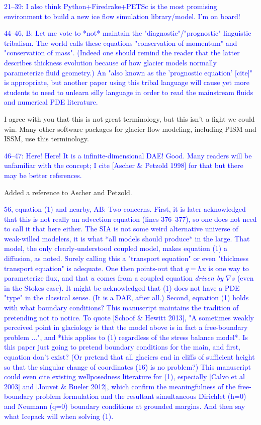 \documentclass{article}
\theoremstyle{definition}
\theoremstyle{plain}
\begin{document}
\textcolor{blue}{21--39:  I also think Python+Firedrake+PETSc is the most promising environment to build a new ice flow simulation library/model.  I'm on board!}

\textcolor{blue}{44--46, B:  Let me vote to *not* maintain the "diagnostic"/"prognostic" linguistic tribalism.  The world calls these equations "conservation of momentum" and "conservation of mass".  (Indeed one should remind the reader that the latter describes thickness evolution because of how glacier models normally parameterize fluid geometry.)  An "also known as the 'prognostic equation' [cite]" is appropriate, but another paper using this tribal language will cause yet more students to need to unlearn silly language in order to read the mainstream fluids and numerical PDE literature.}

I agree with you that this is not great terminology, but this isn't a fight we could win.
Many other software packages for glacier flow modeling, including PISM and ISSM, use this terminology.

\textcolor{blue}{46--47:  Here!  Here!  It is a infinite-dimensional DAE!  Good.  Many readers will be unfamiliar with the concept; I cite [Ascher \& Petzold 1998] for that but there may be better references.}

Added a reference to Ascher and Petzold.

\textcolor{blue}{56, equation (1) and nearby, AB:  Two concerns.  First, it is later acknowledged that this is not really an advection equation (lines 376--377), so one does not need to call it that here either.  The SIA is not some weird alternative universe of weak-willed modelers, it is what *all models should produce* in the large.  That model, the only clearly-understood coupled model, makes equation (1) a diffusion, as noted.  Surely calling this a "transport equation" or even "thickness transport equation" is adequate.  One then points-out that $q=hu$ is one way to parameterize flux, and that $u$ comes from a coupled equation \emph{driven by $\nabla s$} (even in the Stokes case).  It might be acknowledged that (1) does not have a PDE "type" in the classical sense.  (It is a DAE, after all.)  Second, equation (1) holds with what boundary conditions?  This manuscript maintains the tradition of pretending not to notice.  To quote [Schoof \& Hewitt 2013], "A sometimes weakly perceived point in glaciology is that the model above is in fact a free-boundary problem ...", and *this applies to (1) regardless of the stress balance model*.  Is this paper just going to pretend boundary conditions for the main, and first, equation don't exist?  (Or pretend that all glaciers end in cliffs of sufficient height so that the singular change of coordinates (16) is no problem?)  This manuscript could even cite existing wellposedness literature for (1), especially [Calvo et al 2003] and [Jouvet \& Bueler 2012], which confirm the meaningfulness of the free-boundary problem formulation and the resultant simultaneous Dirichlet (h=0) and Neumann (q=0) boundary conditions at grounded margins.  And then say what Icepack will when solving (1).}
\end{document}
